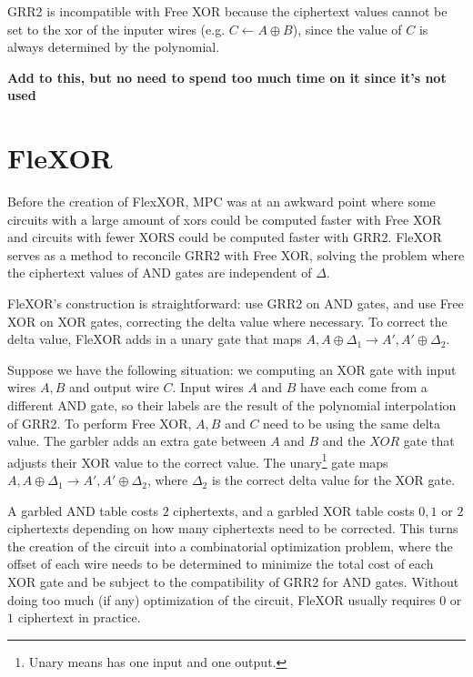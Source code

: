 GRR2 is incompatible with Free XOR because the ciphertext values cannot be set to the xor of the inputer wires (e.g. $C \gets A \oplus B$), since the value of $C$ is always determined by the polynomial.

\textbf{Add to this, but no need to spend too much time on it since it's not used}


\section{FleXOR}
Before the creation of FlexXOR, MPC was at an awkward point where some circuits with a large amount of xors could be computed faster with Free XOR and circuits with fewer XORS could be computed faster with GRR2.
FleXOR serves as a method to reconcile GRR2 with Free XOR, solving the problem where the ciphertext values of AND gates are independent of $\Delta$.

FleXOR's construction is straightforward: use GRR2 on AND gates, and use Free XOR on XOR gates, correcting the delta value where necessary.
To correct the delta value, FleXOR adds in a unary gate that maps $A, A \oplus \Delta_1 \to A', A' \oplus \Delta_2$.

Suppose we have the following situation: we computing an XOR gate with input wires $A,B$ and output wire $C$.
Input wires $A$ and $B$ have each come from a different AND gate, so their labels are the result of the polynomial interpolation of GRR2.
To perform Free XOR, $A,B$ and $C$ need to be using the same delta value. 
The garbler adds an extra gate between $A$ and $B$ and the $XOR$ gate that adjusts their XOR value to the correct value.
The unary\footnote{Unary means has one input and one output.} gate maps $A,A \oplus \Delta_1 \to A', A' \oplus \Delta_2$, where $\Delta_2$ is the correct delta value for the XOR gate.

A garbled AND table costs $2$ ciphertexts, and a garbled XOR table costs $0,1$ or $2$ ciphertexts depending on how many ciphertexts need to be corrected.
This turns the creation of the circuit into a combinatorial optimization problem, where the offset of each wire needs to be determined to minimize the total cost of each XOR gate and be subject to the compatibility of GRR2 for AND gates.
Without doing too much (if any) optimization of the circuit, FleXOR usually requires $0$ or $1$ ciphertext in practice.

